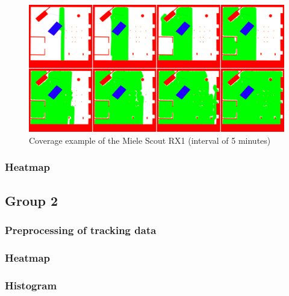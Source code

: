\documentclass[twoside]{article}
\begin{document}
\begin{figure}[H]
	\centering
	\includegraphics[width=\textwidth]{pictures/coverage_process.png}
	\caption{Coverage example of the Miele Scout RX1 (interval of 5 minutes)}
	\label{fig:coverage}
\end{figure}

\subsubsection{Heatmap} %

\subsection{Group 2} %
\subsubsection{Preprocessing of tracking data}
\subsubsection{Heatmap}
\subsubsection{Histogram}

\end{document}
